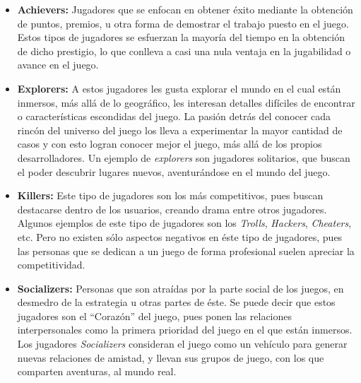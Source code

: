 \begin{itemize}
    \item {\bf Achievers:}
        Jugadores que se enfocan en obtener éxito mediante la obtención de puntos,
        premios, u otra forma de demostrar el trabajo puesto en el juego.
        Estos tipos de jugadores se esfuerzan la mayoría del tiempo en la obtención
        de dicho prestigio, lo que conlleva a casi una nula ventaja en la
        jugabilidad o avance en el juego.

    \item {\bf Explorers:}
        A estos jugadores les gusta explorar el mundo en el cual están inmersos,
        más allá de lo geográfico, les interesan detalles difíciles de encontrar o
        características escondidas del juego.
        La pasión detrás del conocer cada rincón del universo del juego los lleva
        a experimentar la mayor cantidad de casos y con esto logran conocer mejor
        el juego, más allá de los propios desarrolladores.
        Un ejemplo de \emph{explorers} son jugadores solitarios, que buscan el
        poder descubrir lugares nuevos, aventurándose en el mundo del juego.

    \item {\bf Killers:}
        Este tipo de jugadores son los más competitivos, pues buscan destacarse
        dentro de los usuarios, creando drama entre otros jugadores.
        Algunos ejemplos de este tipo de jugadores son los \emph{Trolls},
        \emph{Hackers}, \emph{Cheaters}, etc.
        Pero no existen sólo aspectos negativos en éste tipo de jugadores,
        pues las personas que se dedican a un juego de forma profesional
        suelen apreciar la competitividad.

    \item {\bf Socializers:}
        Personas que son atraídas por la parte social de los juegos,
        en desmedro de la estrategia u otras partes de éste.
        Se puede decir que estos jugadores son el ``Corazón'' del juego,
        pues ponen las relaciones interpersonales como la primera prioridad
        del juego en el que están inmersos.
        Los jugadores \emph{Socializers} consideran el juego
        como un vehículo para generar nuevas relaciones de amistad, y llevan
        sus grupos de juego, con los que comparten aventuras, al mundo real.

\end{itemize}

